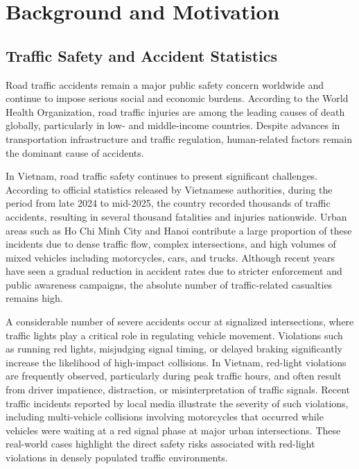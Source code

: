 \section{Background and Motivation}

\subsection{Traffic Safety and Accident Statistics}

Road traffic accidents remain a major public safety concern worldwide and continue to impose serious social and economic burdens. According to the World Health Organization, road traffic injuries are among the leading causes of death globally, particularly in low- and middle-income countries. Despite advances in transportation infrastructure and traffic regulation, human-related factors remain the dominant cause of accidents.

In Vietnam, road traffic safety continues to present significant challenges. According to official statistics released by Vietnamese authorities, during the period from late 2024 to mid-2025, the country recorded thousands of traffic accidents, resulting in several thousand fatalities and injuries nationwide. Urban areas such as Ho Chi Minh City and Hanoi contribute a large proportion of these incidents due to dense traffic flow, complex intersections, and high volumes of mixed vehicles including motorcycles, cars, and trucks. Although recent years have seen a gradual reduction in accident rates due to stricter enforcement and public awareness campaigns, the absolute number of traffic-related casualties remains high.

A considerable number of severe accidents occur at signalized intersections, where traffic lights play a critical role in regulating vehicle movement. Violations such as running red lights, misjudging signal timing, or delayed braking significantly increase the likelihood of high-impact collisions. In Vietnam, red-light violations are frequently observed, particularly during peak traffic hours, and often result from driver impatience, distraction, or misinterpretation of traffic signals. Recent traffic incidents reported by local media illustrate the severity of such violations, including multi-vehicle collisions involving motorcycles that occurred while vehicles were waiting at a red signal phase at major urban intersections. These real-world cases highlight the direct safety risks associated with red-light violations in densely populated traffic environments.


